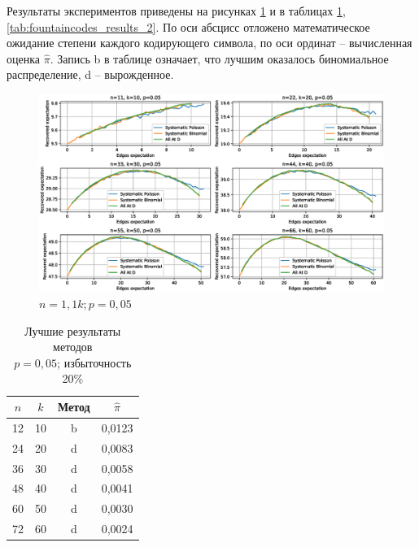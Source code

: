 Результаты экспериментов приведены на рисунках \ref{fig:exp1} и в таблицах
\ref{tab:fountaincodes_results_1}, \ref{tab:fountaincodes_results_2}.
По оси абсцисс отложено математическое ожидание степени каждого кодирующего символа, по оси ординат -- вычисленная оценка $\hat\pi$.
Запись b в таблице означает, что лучшим оказалось биномиальное распределение, d -- вырожденное.

\begin{figure}[ht]
    \centering
    \includegraphics[scale=0.55]{img/exp1.eps}
    \caption{$n=1{,}1k; p=0{,}05$}
    \label{fig:exp1}
\end{figure}

\begin{table}
\begin{center}
    \begin{tabular}{|c|c|c|c|}
        \hline
        $n$ & $k$ & Метод & $\hat\pi$ \\
        \hline
        12 & 10 & b & 0{,}0123 \\
        \hline
        24 & 20 & d & 0{,}0083 \\
        \hline
        36 & 30 & d & 0{,}0058 \\
        \hline
        48 & 40 & d & 0{,}0041 \\
        \hline
        60 & 50 & d & 0{,}0030 \\
        \hline
        72 & 60 & d & 0{,}0024 \\
        \hline
    \end{tabular}
    \caption{Лучшие результаты методов\\ $p=0{,}05$; избыточность 20\%}
    \label{tab:fountaincodes_results_1}
\end{center}
\end{table}

